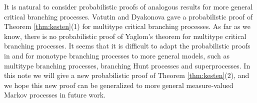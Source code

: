 \documentclass[12pt]{amsart}
\numberwithin{equation}{section}
\begin{document}
It is natural to consider probabilistic proofs of analogous results for more general
critical branching processes. Vatutin and  Dyakonova \cite{VD} gave a probabilistic proof of Theorem \ref{thm:kesten}(1) for multitype critical branching processes.
As far as we know, there is no probabilistic proof of Yaglom's theorem for 
multitype critical branching processes. It seems that it is difficult to adapt
the probabilistic proofs in \cite{lyons1995conceptual} and \cite{geiger2000new} for monotype branching processes to more general models, such as multitype  
branching processes, branching Hunt processes and superprocesses. 
In this note we will give a new probabilistic proof of Theorem \ref{thm:kesten}(2), and we hope this new proof can be generalized to more general measure-valued Markov processes in future work.
\end{document}
